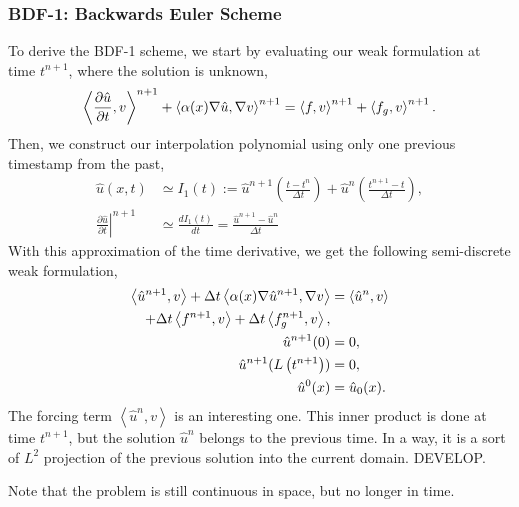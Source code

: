 \documentclass[../main.tex]{subfiles}
\newcommand{\inner}[2]{\left<#1, #2\right>}
\begin{document}
\subsubsection{BDF-1: Backwards Euler Scheme}
To derive the BDF-1 scheme, we start by evaluating our weak formulation at time $t^{n+1}$, where the solution is unknown,
\begin{equation}
    \inner{\frac{\partial \hat{u}}{\partial t}}{v}^{n+1} + \inner{\alpha(x) \grad \hat{u}}{\grad v}^{n+1} = \inner{f}{v}^{n+1} + \inner{f_g}{v}^{n+1}.
\end{equation}
Then, we construct our interpolation polynomial using only one previous timestamp from the past, 
\begin{align}
    \hat{u}(x,t) &\simeq I_1(t) := 
    \hat{u}^{n+1}\left( \frac{t-t^{n}}{\Delta t}  \right)
    + \hat{u}^{n}\left(\frac{t^{n+1}-t}{\Delta t}\right), \\
    \left.\frac{\partial\hat{u}}{\partial t}\right|^{n+1} &\simeq \frac{d I_1(t)}{dt} = \frac{\hat{u}^{n+1} - \hat{u}^{n}}{\Delta t}
\end{align}
With this approximation of the time derivative, we get the following semi-discrete weak formulation, 
\begin{subequations}
    \begin{align}
        \label{eq:1d_fom_weak_formulation_semidiscrete_time}
        \inner{\hat{u}^{n+1}}{v} + \Delta t \inner{\alpha(x) \grad \hat{u}^{n+1}}{\grad v} &= \inner{\hat{u}^{n}}{v} \\
        + \Delta t \inner{f^{n+1}}{v} + \Delta t \inner{f_g^{n+1}}{v}, \nonumber \\
        \hat{u}^{n+1}(0) &= 0, \\
        \hat{u}^{n+1}(L\left(t^{n+1}\right)) &= 0, \\
        \hat{u}^{0}(x) &= \hat{u}_0(x).
    \end{align}
\end{subequations}
The forcing term $\inner{\hat{u}^{n}}{v}$ is an interesting one.
This inner product is done at time $t^{n+1}$, but the solution $\hat{u}^{n}$ belongs to the previous time. 
In a way, it is a sort of $L^2$ projection of the previous solution into the current domain.
DEVELOP. 

Note that the problem is still continuous in space, but no longer in time.
\end{document}
